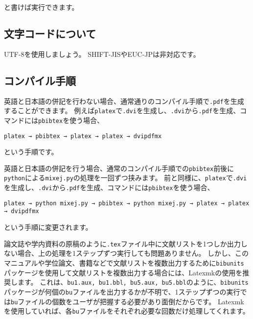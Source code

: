 \documentclass[10pt, a4paper]{jsarticle}
\begin{document}
\noindent\makebox[\linewidth]{\rule{\linewidth}{0.4pt}}\vspace{-0.5zw}
\begin{lstlisting}[style=onecol]

\end{lstlisting}\vspace{-1.8zw}
\noindent\makebox[\linewidth]{\rule{\linewidth}{0.4pt}}\vspace{0.5zw}\par
\noindent
と書けば実行できます。



\subsection{文字コードについて}

UTF-8を使用しましょう。
SHIFT-JISやEUC-JPは非対応です。


\subsection{コンパイル手順}
\label{sec:compile_procedure}

英語と日本語の併記を行わない場合、通常通りのコンパイル手順で\texttt{.pdf}を生成することができます。
例えば\texttt{platex}で\texttt{.dvi}を生成し、\texttt{.dvi}から\texttt{.pdf}を生成、\BibTeX コマンドには\texttt{pbibtex}を使う場合、
\begin{center}
\texttt{platex → pbibtex → platex → platex → dvipdfmx}
\end{center}
という手順です。

英語と日本語の併記を行う場合、通常のコンパイル手順での\texttt{pbibtex}前後に\texttt{python}による\texttt{mixej.py}の処理を一回ずつ挟みます。
前と同様に、\texttt{platex}で\texttt{.dvi}を生成し、\texttt{.dvi}から\texttt{.pdf}を生成、\BibTeX コマンドには\texttt{pbibtex}を使う場合、
\begin{center}
\texttt{platex → python mixej.py → pbibtex → python mixej.py → platex → platex → dvipdfmx}
\end{center}
という手順に変更されます。

論文誌や学内資料の原稿のように\texttt{.tex}ファイル中に文献リストを1つしか出力しない場合、上の処理を1ステップずつ実行しても問題ありません。
しかし、このマニュアルや学位論文、書籍などで文献リストを複数出力するために\texttt{bibunits}パッケージを使用して文献リストを複数出力する場合には、Latexmkの使用を推奨します。
これは、\texttt{bu1.aux, bu1.bbl, bu5.aux, bu5.bbl}のように、\texttt{bibunits}パッケージが何個の\texttt{bu}ファイルを出力するかが不明で、1ステップずつの実行では\texttt{bu}ファイルの個数をユーザが把握する必要があり面倒だからです。
Latexmkを使用していれば、各\texttt{bu}ファイルをそれぞれ必要な回数だけ処理してくれます。
\end{document}
